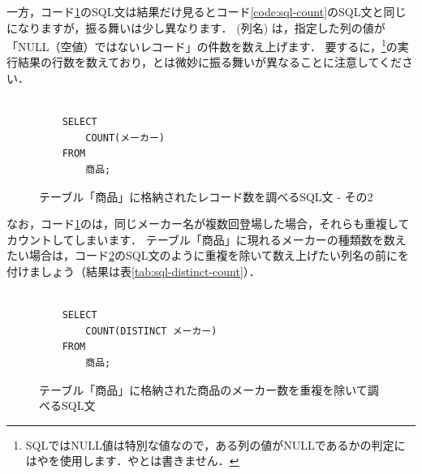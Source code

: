 一方，コード\ref{code:sql-count2}のSQL文は結果だけ見るとコード\ref{code:sql-count}のSQL文と同じになりますが，振る舞いは少し異なります．
(列名) は，指定した列の値が「NULL（空値）ではないレコード」の件数を数え上げます．
要するに，\footnote{SQLではNULL値は特別な値なので，ある列の値がNULLであるかの判定にはやを使用します．やとは書きません．}の実行結果の行数を数えており，とは微妙に振る舞いが異なることに注意してください．
\begin{figure}[!htbp]
    \begin{verbatim}

    SELECT
        COUNT(メーカー)
    FROM
        商品;

    \end{verbatim}
    \captionsetup{name=コード}
    \caption{テーブル「商品」に格納されたレコード数を調べるSQL文 - その2}
    \label{code:sql-count2}
\end{figure}
なお，コード\ref{code:sql-count2}のは，同じメーカー名が複数回登場した場合，それらも重複してカウントしてしまいます．
テーブル「商品」に現れるメーカーの種類数を数えたい場合は，コード\ref{code:sql-distinct-count}のSQL文のように重複を除いて数え上げたい列名の前にを付けましょう（結果は表\ref{tab:sql-distinct-count}）．
\begin{figure}[!htbp]
    \begin{verbatim}

    SELECT
        COUNT(DISTINCT メーカー)
    FROM
        商品;

    \end{verbatim}
    \captionsetup{name=コード}
    \caption{テーブル「商品」に格納された商品のメーカー数を重複を除いて調べるSQL文}
    \label{code:sql-distinct-count}
\end{figure}
\begin{table}[!htbp]
    \centering
    \caption{テーブル「商品」に格納された商品のメーカー数を重複を除いて調べた結果}
    \label{tab:sql-distinct-count}
\end{table}

